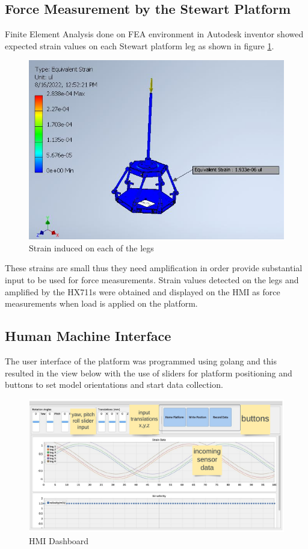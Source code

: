 \subsection{Force Measurement by the Stewart Platform}
Finite Element Analysis done on FEA environment in Autodesk inventor showed expected strain values on each
Stewart platform leg as shown in figure \ref{strain}.

\begin{center}
	\begin{figure}[H]
		\centering
		\includegraphics[width=0.6\linewidth]{Figures/Equivalent}
		\caption[Equivalent strain]{Strain induced on each of the legs}
		\label{strain}
	\end{figure}
\end{center}
These strains are small thus they need amplification in order provide
 substantial input to be used for force measurements. Strain values detected on the legs and amplified by the
 HX711s were obtained and displayed on the HMI as force measurements when load is applied on the platform.
\subsection{Human Machine Interface}
The user interface of the platform was programmed using golang and this resulted in the view below with the use of sliders for platform positioning and buttons to set model orientations and start data collection.
\begin{center}
	\begin{figure}[H]
		\centering
		\includegraphics[width=1\linewidth]{Figures/hmi}
		\caption[HMI Dashboard]{HMI Dashboard}
	\end{figure}
\end{center}

